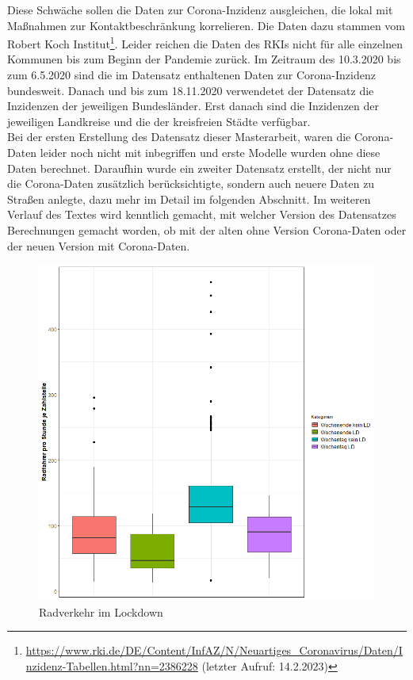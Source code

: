 \documentclass[a4paper,12pt]{thesis}
\begin{document}
Diese Schwäche sollen die Daten zur Corona-Inzidenz ausgleichen, die lokal mit Maßnahmen zur Kontaktbeschränkung korrelieren. Die Daten dazu stammen vom Robert Koch Institut\footnote{\url{https://www.rki.de/DE/Content/InfAZ/N/Neuartiges_Coronavirus/Daten/Inzidenz-Tabellen.html?nn=2386228} (letzter Aufruf: 14.2.2023)}. Leider reichen die Daten des RKIs nicht für alle einzelnen Kommunen bis zum Beginn der Pandemie zurück. Im Zeitraum des 10.3.2020 bis zum 6.5.2020 sind die im Datensatz enthaltenen Daten zur Corona-Inzidenz bundesweit. Danach und bis zum 18.11.2020 verwendetet der Datensatz die Inzidenzen der jeweiligen Bundesländer. Erst danach sind die Inzidenzen der jeweiligen Landkreise und die der kreisfreien Städte verfügbar.\\
Bei der ersten Erstellung des Datensatz dieser Masterarbeit, waren die Corona-Daten leider noch nicht mit inbegriffen und erste Modelle wurden ohne diese Daten berechnet. Daraufhin wurde ein zweiter Datensatz erstellt, der nicht nur die Corona-Daten zusätzlich berücksichtigte, sondern auch neuere Daten zu Straßen anlegte, dazu mehr im Detail im folgenden Abschnitt. Im weiteren Verlauf des Textes wird kenntlich gemacht, mit welcher Version des Datensatzes Berechnungen gemacht worden, ob mit der alten ohne Version Corona-Daten oder der neuen Version mit Corona-Daten.\\

\begin{figure}[!ht]
	\centering
	\includegraphics[width=\textwidth]{Plots/plot63.png}
	\caption{Radverkehr im Lockdown}
	\label{CoronaandBiking}
\end{figure}
\end{document}
